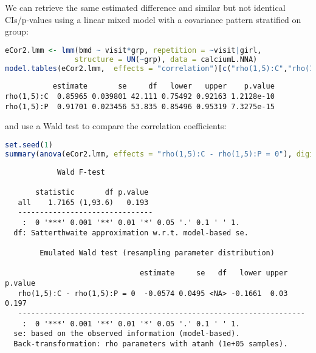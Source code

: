 \documentclass[12pt]{article}
\begin{document}
We can retrieve the same estimated difference and similar but not
identical CIs/p-values using a linear mixed model with a covariance
pattern stratified on group:
\begin{lstlisting}[language=r,numbers=none]
eCor2.lmm <- lmm(bmd ~ visit*grp, repetition = ~visit|girl,
                structure = UN(~grp), data = calciumL.NNA)
model.tables(eCor2.lmm,  effects = "correlation")[c("rho(1,5):C","rho(1,5):P"),]
\end{lstlisting}

\label{}
\begin{verbatim}
           estimate       se     df   lower   upper    p.value
rho(1,5):C  0.85965 0.039801 42.111 0.75492 0.92163 1.2128e-10
rho(1,5):P  0.91701 0.023456 53.835 0.85496 0.95319 7.3275e-15
\end{verbatim}


and use a Wald test to compare the correlation coefficients:
\begin{lstlisting}[language=r,numbers=none]
set.seed(1)
summary(anova(eCor2.lmm, effects = "rho(1,5):C - rho(1,5):P = 0"), digits = 4)
\end{lstlisting}

\label{}
\begin{verbatim}
            Wald F-test 

       statistic       df p.value  
   all    1.7165 (1,93.6)   0.193  
   ------------------------------- 
    :  0 '***' 0.001 '**' 0.01 '*' 0.05 '.' 0.1 ' ' 1.
  df: Satterthwaite approximation w.r.t. model-based se. 

		Emulated Wald test (resampling parameter distribution) 

                               estimate     se   df   lower upper p.value  
   rho(1,5):C - rho(1,5):P = 0  -0.0574 0.0495 <NA> -0.1661  0.03   0.197  
   ------------------------------------------------------------------ 
    :  0 '***' 0.001 '**' 0.01 '*' 0.05 '.' 0.1 ' ' 1.
  se: based on the observed information (model-based). 
  Back-transformation: rho parameters with atanh (1e+05 samples).
\end{verbatim}
\end{document}
